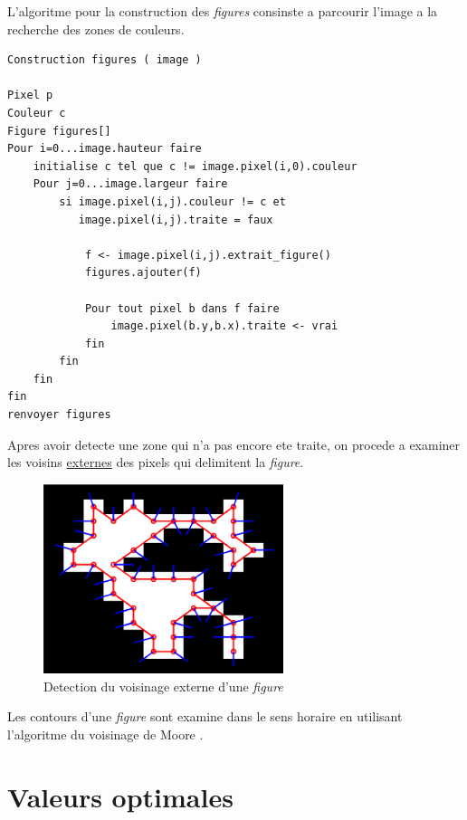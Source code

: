 \documentclass[twoside,openright,a4paper,11pt,french]{article}
\begin{document}
L'algoritme pour la construction des {\it figures} consinste a parcourir
l'image a la recherche des zones de couleurs. 

\begin{lstlisting}[frame=single]  % Start your code-block
Construction figures ( image )

Pixel p
Couleur c
Figure figures[]
Pour i=0...image.hauteur faire
    initialise c tel que c != image.pixel(i,0).couleur 
    Pour j=0...image.largeur faire
        si image.pixel(i,j).couleur != c et 
           image.pixel(i,j).traite = faux

            f <- image.pixel(i,j).extrait_figure()
            figures.ajouter(f)

            Pour tout pixel b dans f faire
                image.pixel(b.y,b.x).traite <- vrai
            fin 
        fin 
    fin
fin
renvoyer figures
\end{lstlisting}


Apres avoir detecte une zone qui n'a pas encore ete traite, on procede
a examiner les voisins \underline{externes} des pixels qui delimitent
la {\it figure}.

\begin{figure}[h]
\centering
\includegraphics[width=7cm]{./pics/moore.eps}
\caption{Detection du voisinage externe d'une {\it figure}}
\label{fig:moore}
\end{figure}

Les contours d'une {\it figure} sont examine dans le sens horaire en
utilisant l'algoritme du voisinage de Moore \cite{url-moore}.




\section{Valeurs optimales}



\newpage
{}


\end{document}

